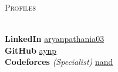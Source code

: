 \documentclass[a4paper]{article}
\newcommand{\lineunder} {
    \vspace*{-8pt} \\
    \hspace*{-18pt} \hrulefill \\
}
\newcommand{\header} [1] {
    {\hspace*{-18pt}\vspace*{6pt} \textsc{#1}}
    \vspace*{-6pt} \lineunder
}
\begin{document}

\header{Profiles}
\vspace{1mm}

{\textbf{LinkedIn}} \hfill \href{https://www.linkedin.com/in/aryanpathania03/}{aryanpathania03}\\
\vspace*{2mm}
{\textbf{GitHub}} \hfill \href{https://www.github.com/aynp}{aynp}\\
\vspace*{2mm}
{\textbf{Codeforces}} {\sl (Specialist)}  \hfill \href{https://codeforces.com/profile/nand}{nand}\\
\
\end{document}
